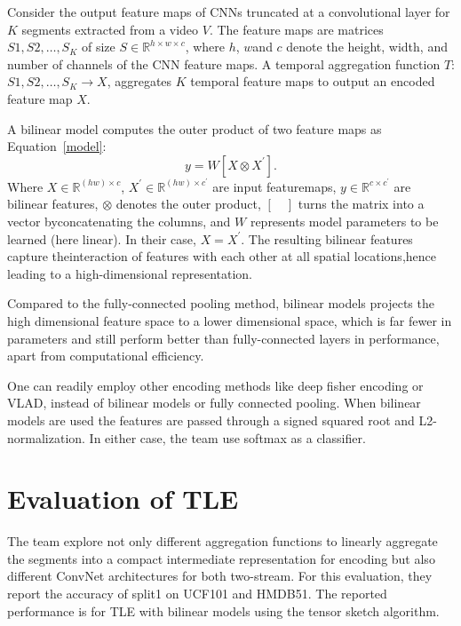 \documentclass[10pt,twocolumn,letterpaper]{article}
\begin{document}
Consider the output feature maps of CNNs truncated at a convolutional layer for $K$ segments extracted from a video $V$. The feature maps are matrices ${S1, S2,\dots, S_K}$ of size $S\in \mathbb{R}^{h\times w\times c}$, where $h$, $w$and $c$ denote the height, width, and number of channels of the CNN feature maps. A temporal aggregation function $T$: $S1, S2,\dots, S_K\rightarrow X$, aggregates $K$ temporal feature maps to output an encoded feature map $X$.

A bilinear model \cite{lin2015bilinear} computes the outer product of two feature maps as Equation~\ref{model}:
\begin{equation}
y=W[X\otimes X^\prime].  \label{model} 
\end{equation}
Where $X\in \mathbb{R}^{(hw)\times c}$, $X^\prime \in \mathbb{R}^{(hw)\times c^\prime}$ are input featuremaps, $y\in \mathbb{R}^{c\times c^\prime}$ are bilinear features, $\otimes$ denotes the outer product, $[\quad]$ turns the matrix into a vector byconcatenating the columns, and $W$ represents model parameters to be learned (here linear). In their case, $X=X^\prime$. The resulting bilinear features capture theinteraction of features with each other at all spatial locations,hence leading to a high-dimensional representation.

Compared to the fully-connected pooling method, bilinear models projects the high dimensional feature space to a lower dimensional space, which is far fewer in parameters and still perform better than fully-connected layers in performance, apart from computational efficiency.

One can readily employ other encoding methods like deep fisher encoding or VLAD, instead of bilinear models or fully connected pooling. When bilinear models are used the features are passed through a signed squared root and L2-normalization. In either case, the team use softmax as a classifier.

\section{Evaluation of TLE}

The team explore not only different aggregation functions to linearly aggregate the segments into a compact intermediate representation for encoding but also different ConvNet architectures for both two-stream. For this evaluation, they report the accuracy of split1 on UCF101 and HMDB51. The reported performance is for TLE with bilinear models using the tensor sketch algorithm.
\end{document}
